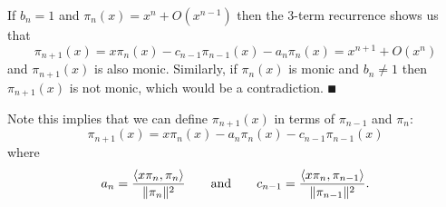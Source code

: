 If $b_n = 1$ and $\ensuremath{\pi}_n(x) = x^n + O(x^{n-1})$ then the 3-term recurrence shows us that
\[
\ensuremath{\pi}_{n+1}(x) = x \ensuremath{\pi}_n(x) - c_{n-1} \ensuremath{\pi}_{n-1}(x) - a_n \ensuremath{\pi}_n(x) = x^{n+1} + O(x^n)
\]
and $\ensuremath{\pi}_{n+1}(x)$ is also monic. Similarly, if $\ensuremath{\pi}_n(x)$ is monic and $b_n \ensuremath{\neq} 1$ then $\ensuremath{\pi}_{n+1}(x)$ is not monic, which would be a contradiction. \ensuremath{\QED}

Note this implies that we can define $\ensuremath{\pi}_{n+1}(x)$ in terms of $\ensuremath{\pi}_{n-1}$ and $\ensuremath{\pi}_n$:
\[
\ensuremath{\pi}_{n+1}(x) = x \ensuremath{\pi}_n(x) - a_n \ensuremath{\pi}_n(x) - c_{n-1} \ensuremath{\pi}_{n-1}(x)
\]
where
\[
a_n = {\ensuremath{\langle}x \ensuremath{\pi}_n, \ensuremath{\pi}_n\ensuremath{\rangle} \over \| \ensuremath{\pi}_n\|^2} \qquad \hbox{and} \qquad c_{n-1} = {\ensuremath{\langle}x \ensuremath{\pi}_n, \ensuremath{\pi}_{n-1}\ensuremath{\rangle} \over \| \ensuremath{\pi}_{n-1}\|^2}.
\]
